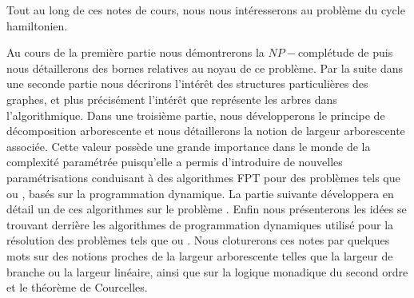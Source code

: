 Tout au long de ces notes de cours, nous nous intéresserons au problème du cycle hamiltonien. 

Au cours de la première partie nous démontrerons la $NP-$complétude de \hcycle puis nous
détaillerons des bornes relatives au noyau de ce problème. Par la suite dans une seconde partie nous
décrirons l'intérêt des structures particulières des graphes, et plus précisément l'intérêt que
représente les arbres dans l'algorithmique. Dans une troisième partie, nous développerons le
principe de décomposition arborescente et nous détaillerons la notion de largeur arborescente
associée. Cette valeur possède une grande importance dans le monde de la complexité paramétrée
puisqu'elle a permis d'introduire de nouvelles paramétrisations conduisant à des algorithmes FPT
pour des problèmes tels que \wiset ou \hcycle, basés sur la programmation dynamique. La partie
suivante développera en détail un de ces algorithmes sur le problème \hcycle. Enfin nous
présenterons les idées se trouvant derrière les algorithmes de programmation dynamiques utilisé pour
la résolution des problèmes tels que \wiset ou \fvset. Nous cloturerons ces notes par quelques mots
sur des notions proches de la largeur arborescente telles que la largeur de branche ou la largeur
linéaire, ainsi que sur la logique monadique du second ordre et le théorème de Courcelles.

